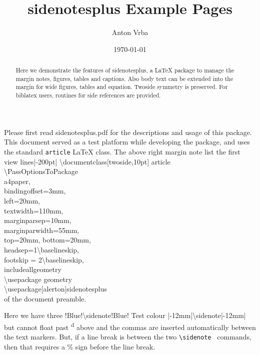 \documentclass[twoside,10pt,ragged]{article}
\title{\textbf{\textsf{sidenotesplus}} Example Pages}
\author{Anton Vrba}
\date{	\today}
\begin{document}
	\maketitle
	
	\begin{abstract}
		\noindent Here we demonstrate the features of \textsf{sidenotesplus},
        a \LaTeX\xspace package to manage the margin notes, figures, tables and captions.
        Also body text can be extended into the margin for wide figures, tables and equation.
        Twoside symmetry is preserved. For biblatex users, routines for side references are
        provided.
	\end{abstract}


Please first read \textsf{sidenotesplus.pdf} for the descriptions and usage of this package.
This document served as a test platform while developing the package, and uses the standard
\verb"article" \LaTeX\xspace class. The above right margin note list the first view
lines\sidenote|-200pt|{%
\ttfamily\upshape\textbackslash documentclass[twoside,10pt]\textbraceleft
article\textbraceright\\
\textbackslash PassOptionsToPackage\textbraceleft\\
\makebox[2ex]{} a4paper,\\
\makebox[2ex]{} bindingoffset=3mm,\\
\makebox[2ex]{} left=20mm,\\
\makebox[2ex]{} textwidth=110mm,\\
\makebox[2ex]{} marginparsep=10mm,\\
\makebox[2ex]{} marginparwidth=55mm,\\
\makebox[2ex]{} top=20mm, bottom=20mm,\\
\makebox[2ex]{} headsep=1\textbackslash baselineskip,\\
\makebox[2ex]{} footskip = 2\textbackslash baselineskip,\\
\makebox[2ex]{} includeall\textbraceright   \textbraceleft geometry\textbraceright\\
\textbackslash usepackage  \textbraceleft geometry\textbraceright\\
\textbackslash usepackage[alerton]\textbraceleft sidenotesplus\textbraceright\\
} of the document preamble.

Here we have three %
\sidenote!Blue!{\textsf{\upshape\textbackslash sidenote!Blue!} Test colour}%
\sidenote|-12mm|{\textsf{\upshape\textbackslash sidenote|-12mm|} but cannot float past \textsuperscript d above}
 and the commas are inserted automatically between the text markers. But, if a line break
 is between the two \verb"\sidenote " commands, then that requires a \% sign before the line  break.
\end{document}
